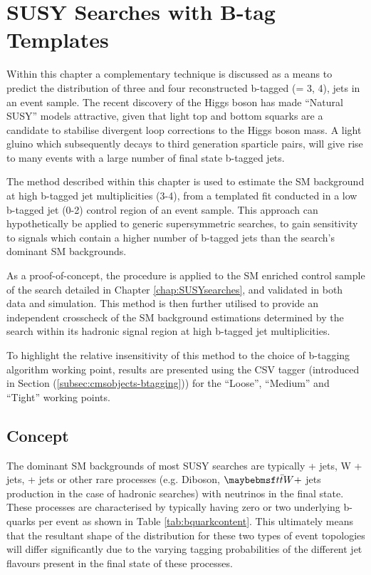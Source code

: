\chapter{SUSY Searches with B-tag Templates}
\label{chap:templatemethod}


Within this chapter a complementary technique is discussed as a means to predict the distribution of three and four reconstructed b-tagged (\nbreco = 3, 4), jets in an event sample. The recent discovery of the Higgs boson has made ``Natural \ac{SUSY}'' models attractive, given that light top and bottom squarks are a candidate to stabilise divergent loop corrections to the Higgs boson mass. A light gluino which subsequently decays to third generation sparticle pairs, will give rise to many events with a large number of final state b-tagged jets.

The method described within this chapter is used to estimate the \ac{SM} background at high b-tagged jet multiplicities (3-4), from a templated fit conducted in a low b-tagged jet (0-2) control region of an event sample. This approach can hypothetically be applied to generic supersymmetric searches, to gain sensitivity to signals which contain a higher number of b-tagged jets than the search's dominant \ac{SM} backgrounds. 

As a proof-of-concept, the procedure is applied to the \ac{SM} enriched \mupjets control sample of the \alphat search detailed in Chapter \ref{chap:SUSYsearches}, and validated in both data and simulation. This method is then further utilised to provide an independent crosscheck of the \ac{SM} background estimations determined by the \alphat search within its hadronic signal region at high b-tagged jet multiplicities.

To highlight the relative insensitivity of this method to the choice of b-tagging algorithm working point, results are presented using the \ac{CSV} tagger (introduced in Section (\ref{subsec:cmsobjects-btagging})) for the ``Loose'', ``Medium'' and ``Tight'' working points.

\section{Concept}
\label{sec:templateconcept}

The dominant \ac{SM} backgrounds of most \ac{SUSY} searches are typically \ttbar + jets, W + jets, \zinv + jets or other rare processes (e.g. Diboson, $\ttbar W +$ jets production in the case of hadronic searches) with neutrinos in the final state. These processes are characterised by typically having zero or two underlying b-quarks per event as shown in Table \ref{tab:bquarkcontent}. This ultimately means that the resultant shape of the \nbreco distribution for these two types of event topologies will differ significantly due to the varying tagging probabilities of the different jet flavours present in the final state of these processes.  

